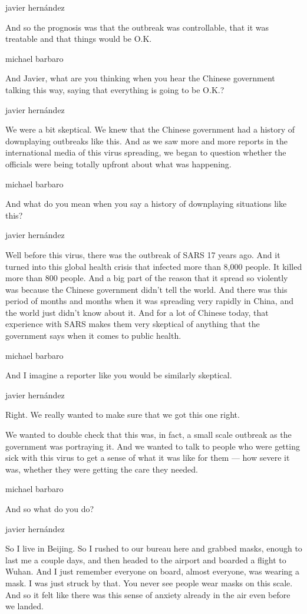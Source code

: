 javier hernández

And so the prognosis was that the outbreak was controllable, that it was
treatable and that things would be O.K.

michael barbaro

And Javier, what are you thinking when you hear the Chinese government
talking this way, saying that everything is going to be O.K.?

javier hernández

We were a bit skeptical. We knew that the Chinese government had a
history of downplaying outbreaks like this. And as we saw more and more
reports in the international media of this virus spreading, we began to
question whether the officials were being totally upfront about what was
happening.

michael barbaro

And what do you mean when you say a history of downplaying situations
like this?

javier hernández

Well before this virus, there was the outbreak of SARS 17 years ago. And
it turned into this global health crisis that infected more than 8,000
people. It killed more than 800 people. And a big part of the reason
that it spread so violently was because the Chinese government didn't
tell the world. And there was this period of months and months when it
was spreading very rapidly in China, and the world just didn't know
about it. And for a lot of Chinese today, that experience with SARS
makes them very skeptical of anything that the government says when it
comes to public health.

michael barbaro

And I imagine a reporter like you would be similarly skeptical.

javier hernández

Right. We really wanted to make sure that we got this one right.

We wanted to double check that this was, in fact, a small scale outbreak
as the government was portraying it. And we wanted to talk to people who
were getting sick with this virus to get a sense of what it was like for
them --- how severe it was, whether they were getting the care they
needed.

michael barbaro

And so what do you do?

javier hernández

So I live in Beijing. So I rushed to our bureau here and grabbed masks,
enough to last me a couple days, and then headed to the airport and
boarded a flight to Wuhan. And I just remember everyone on board, almost
everyone, was wearing a mask. I was just struck by that. You never see
people wear masks on this scale. And so it felt like there was this
sense of anxiety already in the air even before we landed.

